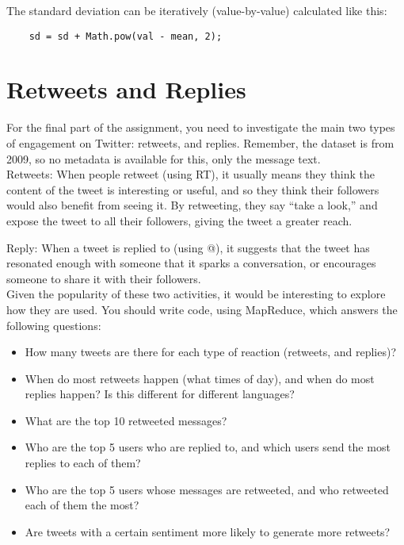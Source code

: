 \documentclass[a4paper,10pt]{article}
\begin{document}
  The standard deviation can be iteratively (value-by-value) calculated like this: 
  \begin{lstlisting}
    sd = sd + Math.pow(val - mean, 2);
  \end{lstlisting}
  
  \section{Retweets and Replies}

  For the final part of the assignment, you need to investigate the main two types of
  engagement on Twitter: retweets, and replies. Remember, the dataset is from 2009,
  so no metadata is available for this, only the message text. \\

  Retweets: When people retweet (using RT), it usually means they think the content of the tweet is interesting or useful,
  and so they think their followers would also benefit from seeing it. By retweeting, they say ``take a look,''  and expose
  the tweet to all their followers, giving the tweet a greater reach.
  
  Reply: When a tweet is replied to (using @), it suggests that the tweet has
  resonated enough with someone that it sparks a conversation, or encourages
  someone to share it with their followers. \\

  Given the popularity of these two activities, it would be interesting to explore how they are used. You should write code, using MapReduce,
  which answers the following questions:

  \begin{itemize}
  \item How many tweets are there for each type of reaction (retweets, and replies)?
  \item When do most retweets happen (what times of day), and when do most replies happen? Is this different for different languages?
  \item What are the top 10 retweeted messages?
  \item Who are the top 5 users who are replied to, and which users send the most replies to each of them?
  \item Who are the top 5 users whose messages are retweeted, and who retweeted each of them the most?
  \item Are tweets with a certain sentiment more likely to generate more retweets?
  \end{itemize}
\end{document}
